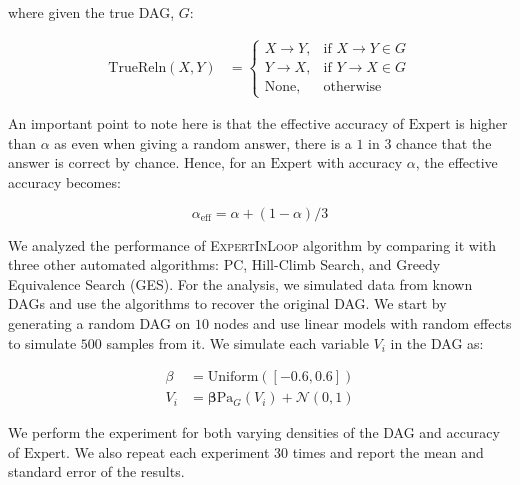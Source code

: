 \documentclass{uai2025} %
\begin{document}
where given the true DAG, $ G $:

\begin{equation}
	\begin{split}
	\mathrm{TrueReln}(X, Y) &= \begin{cases}
					X \rightarrow Y, & \textrm{if } X \rightarrow Y \in G \\
					Y \rightarrow X, & \textrm{if } Y \rightarrow X \in G \\
					\textrm{None}, & \textrm{otherwise }
				  \end{cases}
	\end{split}
\end{equation}

An important point to note here is that the effective accuracy of $
\mathrm{Expert} $ is higher than $ \alpha $ as even when giving a random
answer, there is a $ 1 $ in $ 3 $ chance that the answer is correct by chance.
Hence, for an $ \mathrm{Expert} $ with accuracy $ \alpha $, the effective
accuracy becomes:

\begin{equation}
	\alpha_{\mathrm{eff}} = \alpha + (1 - \alpha) / 3
\end{equation}


We analyzed the performance of \textsc{ExpertInLoop} algorithm by comparing it
with three other automated algorithms: PC, Hill-Climb Search, and Greedy
Equivalence Search (GES). For the analysis, we simulated data from known DAGs
and use the algorithms to recover the original DAG. We start by generating a
random DAG on $10$ nodes and use linear models with random effects to simulate
$ 500 $ samples from it. We simulate each variable $ V_i $ in the DAG as:


\begin{equation}
	\begin{split}
		\beta &= \mathrm{Uniform}([-0.6, 0.6]) \\
		V_i &= \bm{\beta} \mathrm{Pa}_G(V_i) + \mathcal{N}(0, 1)
	\end{split}
\end{equation}

We perform the experiment for both varying densities of the DAG and accuracy of
$\mathrm{Expert}$. We also repeat each experiment $ 30 $ times and report the
mean and standard error of the results.
\end{document}
